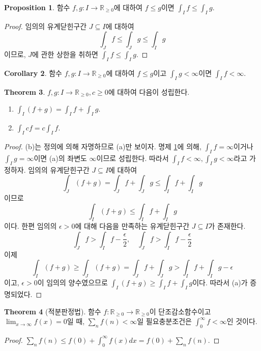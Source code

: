 \documentclass[11pt]{book}
\numberwithin{equation}{chapter}
\def\RR{\mathbb{R}}
\def\eps{\epsilon}
\theoremstyle{definition}
\newtheorem{thm}{Theorem}[section]
\newtheorem{cor}[thm]{Corollary}
\newtheorem{prop}[thm]{Proposition}
\newenvironment{enum}
	{\begin{enumerate}[label=(\alph*), leftmargin=2\parindent]}
	{\end{enumerate}}
\begin{document}
\begin{prop} \label{13.1.3}
    함수 \(f, g : I \to \RR_{\ge 0}\)에 대하여 \(f \le g\)이면 \(\int_I f \le \int_I g\).
\end{prop}
\begin{proof}
    임의의 유계닫힌구간 \(J \subseteq I\)에 대하여
    \[
    \int_J f \le \int_J g \le \int_I g    
    \]
    이므로, \(J\)에 관한 상한을 취하면 \(\int_I f \le \int_I g\).
\end{proof}

\begin{cor}
    함수 \(f, g : I \to \RR_{\ge 0}\)에 대하여 \(f \le g\)이고 \(\int_I g < \infty\)이면 \(\int_I f < \infty\).
\end{cor}

\begin{thm}
    \(f, g : I \to \RR_{\ge 0}, c \ge 0\)에 대하여 다음이 성립한다.
    \begin{enum}
        \item \(\int_I (f+g) = \int_I f + \int_I g\).
        \item \(\int_I cf = c \int_I f\).
    \end{enum}
\end{thm}
\begin{proof}
    (b)는 정의에 의해 자명하므로 (a)만 보이자. 명제 \ref{13.1.3}에 의해, \(\int_I f = \infty\)이거나 \(\int_I g = \infty\)이면 (a)의 좌변도 \(\infty\)이므로 성립한다. 따라서 \(\int_I f < \infty, \int_I g < \infty\)라고 가정하자. 임의의 유계닫힌구간 \(J \subseteq I\)에 대하여
    \[
    \int_J (f+g) = \int_J f + \int_J g \le \int_I f + \int_I g    
    \]
    이므로
    \[
    \int_I (f+g) \le \int_I f + \int_I g    
    \]
    이다. 한편 임의의 \(\eps > 0\)에 대해 다음을 만족하는 유계닫힌구간 \(J \subseteq I\)가 존재한다.
    \[
    \int_J f > \int_I f - \frac{\eps}{2}, \quad \int_J f > \int_I f - \frac{\eps}{2}    
    \]
    이제
    \[
    \int_I (f+g) \ge \int_J (f+g) = \int_J f + \int_J g > \int_I f + \int_I g - \eps    
    \]
    이고, \(\eps > 0\)이 임의의 양수였으므로 \(\int_I (f+g) \ge \int_I f + \int_I g\)이다. 따라서 (a)가 증명되었다.
\end{proof}

\begin{thm}[적분판정법]
    함수 \(f : \RR_{\ge 0} \to \RR_{\ge 0}\)이 단조감소함수이고 \(\lim_{x \to \infty}f(x) = 0\)일 때, \(\sum_n f(n) < \infty\)일 필요충분조건은 \(\int_0^{\infty} f < \infty\)인 것이다.
\end{thm}
\begin{proof}
    \(\sum_n f(n) \le f(0) + \int_0^\infty f(x) dx = f(0) + \sum_n f(n)\).
\end{proof}
\end{document}
